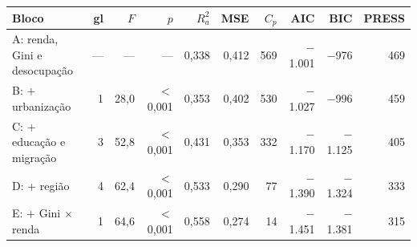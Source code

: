 \begin{tabular}{@{}lrrrrrrrrr@{}}
\toprule
\textbf{Bloco} & \textbf{gl} & \textbf{$F$} & \textbf{$p$} & \textbf{$R^2_a$} & \textbf{MSE} & \textbf{$C_p$} & \textbf{AIC} & \textbf{BIC} & \textbf{PRESS}\\
\midrule
A: renda, Gini e desocupação & --- & --- & --- & 0,338 & 0,412 & 569 & $-$1.001 & $-$976 & 469\\
B: + urbanização & 1 & 28,0 & $<$0,001 & 0,353 & 0,402 & 530 & $-$1.027 & $-$996 & 459\\
C: + educação e migração & 3 & 52,8 & $<$0,001 & 0,431 & 0,353 & 332 & $-$1.170 & $-$1.125 & 405\\
D: + região & 4 & 62,4 & $<$0,001 & 0,533 & 0,290 & 77 & $-$1.390 & $-$1.324 & 333\\
E: + Gini $\times$ renda & 1 & 64,6 & $<$0,001 & 0,558 & 0,274 & 14 & $-$1.451 & $-$1.381 & 315\\
\bottomrule
\end{tabular}
